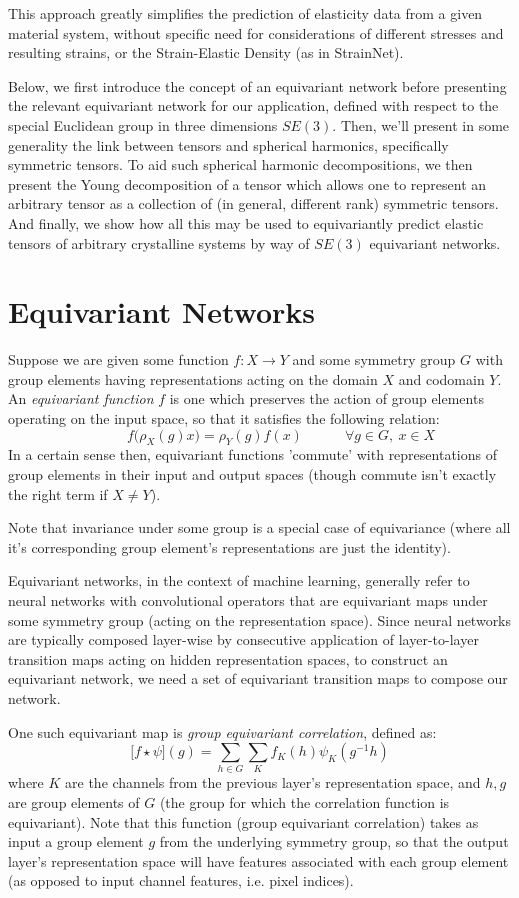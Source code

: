 \documentclass[10pt,a4paper]{article}
\begin{document}
This approach greatly simplifies the prediction of elasticity data from a given material system, without specific need for considerations of different stresses and resulting strains, or the Strain-Elastic Density (as in StrainNet).

Below, we first introduce the concept of an equivariant network before presenting the relevant equivariant network for our application, defined with respect to the special Euclidean group in three dimensions $SE(3)$. Then, we'll present in some generality the link between tensors and spherical harmonics, specifically symmetric tensors. To aid such spherical harmonic decompositions, we then present the Young decomposition of a tensor which allows one to represent an arbitrary tensor as a collection of (in general, different rank) symmetric tensors. And finally, we show how all this may be used to equivariantly predict elastic tensors of arbitrary crystalline systems by way of $SE(3)$ equivariant networks.

\section{Equivariant Networks}
Suppose we are given some function $f:X\rightarrow Y$ and some symmetry group $G$ with group elements having representations acting on the domain $X$ and codomain $Y$. An \textit{equivariant function} $f$ is one which preserves the action of group elements operating on the input space, so that it satisfies the following relation:
$$
\quad\quad\quad f\big(\rho_X(g)x\big) = \rho_Y(g) f(x) \quad\quad\quad \forall g\in G, \ x\in X
$$
In a certain sense then, equivariant functions 'commute' with representations of group elements in their input and output spaces (though commute isn't exactly the right term if $X\neq Y$).

Note that invariance under some group is a special case of equivariance (where all it's corresponding group element's representations are just the identity).


Equivariant networks, in the context of machine learning, generally refer to neural networks with convolutional operators that are equivariant maps under some symmetry group (acting on the representation space). Since neural networks are typically composed layer-wise by consecutive application of layer-to-layer transition maps acting on hidden representation spaces, to construct an equivariant network, we need a set of equivariant transition maps to compose our network.

One such equivariant map is \textit{group equivariant correlation}, defined as:
$$
\big[f\star \psi \big](g) = \sum_{h\in G}\sum_K f_K(h)\psi_{K}(g^{-1}h)
$$
where $K$ are the channels from the previous layer's representation space, and $h,g$ are group elements of $G$ (the group for which the correlation function is equivariant). Note that this function (group equivariant correlation) takes as input a group element $g$ from the underlying symmetry group, so that the output layer's representation space will have features associated with each group element (as opposed to input channel features, i.e. pixel indices).
\end{document}
